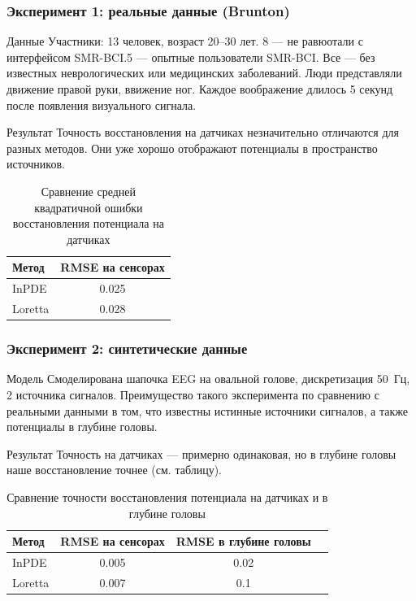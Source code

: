 \documentclass{beamer}
\begin{document}
\begin{frame}
\frametitle{Эксперимент 1: реальные данные (Brunton)}
\begin{block}{Данные}
Участники: 13 человек, возраст 20–30 лет. 8 — не равюотали с интерфейсом SMR-BCI.5 — опытные пользователи SMR-BCI. Все — без известных неврологических или медицинских заболеваний.
Люди представляли движение правой руки, ввижение ног. Каждое воображение длилось 5 секунд после появления визуального сигнала.
\end{block}
\begin{block}{Результат}
Точность восстановления на датчиках незначительно отличаются для разных методов. Они уже хорошо отображают потенциалы в пространство источников.
\end{block}
\begin{table}[ht]
\centering
\begin{tabular}{l c}
\hline
Метод & RMSE на сенсорах\\
\hline
InPDE & 0.025 \\
Loretta & 0.028 \\
\hline
\end{tabular}
\caption{Сравнение средней квадратичной ошибки восстановления потенциала на датчиках}
\end{table}
\end{frame}

\begin{frame}
\frametitle{Эксперимент 2: синтетические данные}
\begin{block}{Модель}
Смоделирована шапочка EEG на овальной голове, дискретизация 50~Гц, 2 источника сигналов. Преимущество такого эксперимента по сравнению с реальными данными в том, что известны истинные источники сигналов, а также потенциалы в глубине головы.
\end{block}
\begin{block}{Результат}
Точность на датчиках — примерно одинаковая, но в глубине головы наше восстановление точнее (см. таблицу).
\end{block}
\begin{table}[ht]
\centering
\begin{tabular}{l c c c}
\hline
Метод & RMSE на сенсорах & RMSE в глубине головы \\
\hline
InPDE & 0.005 & 0.02 \\
Loretta & 0.007 & 0.1 \\
\hline
\end{tabular}
\caption{Сравнение точности восстановления потенциала на датчиках и в глубине головы}
\end{table}
\end{frame}
\end{document}
